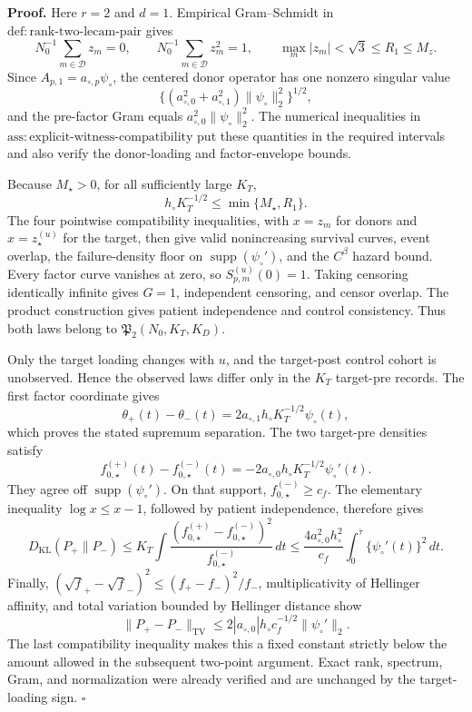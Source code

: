 \textbf{Proof.}
Here \(r=2\) and \(d=1\).  Empirical Gram--Schmidt in \(\mathrm{def:rank\mbox{-}two\mbox{-}lecam\mbox{-}pair}\) gives
\[
 N_0^{-1}\sum_{m\in\mathcal D}z_m=0,\qquad
 N_0^{-1}\sum_{m\in\mathcal D}z_m^2=1,\qquad
 \max_m|z_m|<\sqrt3\le R_1\le M_z.
\]
Since \(A_{p,1}=a_{\circ,p}\psi_\circ\), the centered donor operator has one nonzero singular value
\[
 \{(a_{\circ,0}^2+a_{\circ,1}^2)\|\psi_\circ\|_2^2\}^{1/2},
\]
and the pre-factor Gram equals \(a_{\circ,0}^2\|\psi_\circ\|_2^2\).  The numerical inequalities in \(\mathrm{ass:explicit\mbox{-}witness\mbox{-}compatibility}\) put these quantities in the required intervals and also verify the donor-loading and factor-envelope bounds.

Because \(M_\star>0\), for all sufficiently large \(K_T\),
\[
 h_\circ K_T^{-1/2}\le\min\{M_\star,R_1\}.
\]
The four pointwise compatibility inequalities, with \(x=z_m\) for donors and \(x=z_\star^{(u)}\) for the target, then give valid nonincreasing survival curves, event overlap, the failure-density floor on \(\operatorname{supp}(\psi_\circ')\), and the \(C^\beta\) hazard bound.  Every factor curve vanishes at zero, so \(S_{p,m}^{(u)}(0)=1\).  Taking censoring identically infinite gives \(G=1\), independent censoring, and censor overlap.  The product construction gives patient independence and control consistency.  Thus both laws belong to \(\mathfrak P_2(N_0,K_T,K_D)\).

Only the target loading changes with \(u\), and the target-post control cohort is unobserved.  Hence the observed laws differ only in the \(K_T\) target-pre records.  The first factor coordinate gives
\[
 \theta_+(t)-\theta_-(t)
 =2a_{\circ,1}h_\circ K_T^{-1/2}\psi_\circ(t),
\]
which proves the stated supremum separation.  The two target-pre densities satisfy
\[
 f_{0,\star}^{(+)}(t)-f_{0,\star}^{(-)}(t)
 =-2a_{\circ,0}h_\circ K_T^{-1/2}\psi_\circ'(t).
\]
They agree off \(\operatorname{supp}(\psi_\circ')\).  On that support, \(f_{0,\star}^{(-)}\ge c_f\).  The elementary inequality \(\log x\le x-1\), followed by patient independence, therefore gives
\[
 D_{\mathrm{KL}}(P_+\|P_-)
 \le K_T\int\frac{(f_{0,\star}^{(+)}-f_{0,\star}^{(-)})^2}{f_{0,\star}^{(-)}}\,dt
 \le\frac{4a_{\circ,0}^2h_\circ^2}{c_f}
 \int_0^{\bar\tau}\{\psi_\circ'(t)\}^2\,dt.
\]
Finally, \((\sqrt f_+-\sqrt f_-)^2\le(f_+-f_-)^2/f_-\), multiplicativity of Hellinger affinity, and total variation bounded by Hellinger distance show
\[
 \|P_+-P_-\|_{\mathrm{TV}}
 \le2|a_{\circ,0}|h_\circ c_f^{-1/2}\|\psi_\circ'\|_2.
\]
The last compatibility inequality makes this a fixed constant strictly below the amount allowed in the subsequent two-point argument.  Exact rank, spectrum, Gram, and normalization were already verified and are unchanged by the target-loading sign. \(\square\)